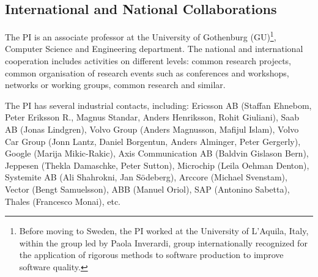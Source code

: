\documentclass[12pt]{article}
\begin{document}
 

 



\vspace{-.4cm}

\subsection{International and National Collaborations }\label{sec:collaboration}
\vspace{-.3cm}
The PI is an associate professor at the University of Gothenburg (GU)\footnote{Before moving to Sweden, the PI worked at the University of L'Aquila, Italy, within the group led by Paola Inverardi, group internationally recognized for the application of rigorous methods to software production to improve software quality.}, Computer Science and Engineering department. 
The national and international cooperation includes activities on different levels: common research projects, common organisation of research events such as conferences and workshops, networks or working groups, common research and similar. 

The PI has several industrial contacts, including: Ericsson AB (Staffan Ehnebom, Peter Eriksson R., Magnus Standar, Anders Henriksson, Rohit Giuliani), Saab AB (Jonas Lindgren), Volvo Group (Anders Magnusson, Mafijul Islam), Volvo Car Group (Jonn Lantz, Daniel Borgentun, Anders Alminger, Peter Gergerly), Google (Marija Mikic-Rakic), Axis Communication AB (Baldvin Gislason Bern), Jeppesen (Thekla Damaschke, Peter Sutton), Microchip (Leila Oehman Denton), Systemite AB (Ali Shahrokni, Jan S\"odeberg), Arccore (Michael Svenstam), Vector (Bengt Samuelsson), ABB (Manuel Oriol), SAP (Antonino Sabetta), Thales (Francesco Monai), etc. 
\end{document}
